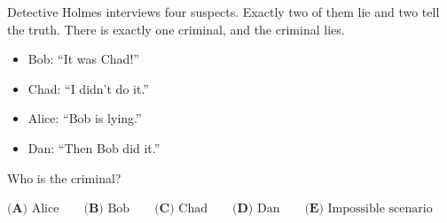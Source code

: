 Detective Holmes interviews four suspects. Exactly two of them lie and two tell the truth. There is exactly one criminal, and the criminal lies.
\begin{itemize}
\item Bob: ``It was Chad!''
\item Chad: ``I didn't do it.''
\item Alice: ``Bob is lying.''
\item Dan: ``Then Bob did it.''
\end{itemize}
Who is the criminal?

$\textbf{(A) }\text{Alice}\qquad\textbf{(B) }\text{Bob}\qquad\textbf{(C) }\text{Chad}\qquad\textbf{(D) }\text{Dan}\qquad\textbf{(E) }\text{Impossible scenario}$
